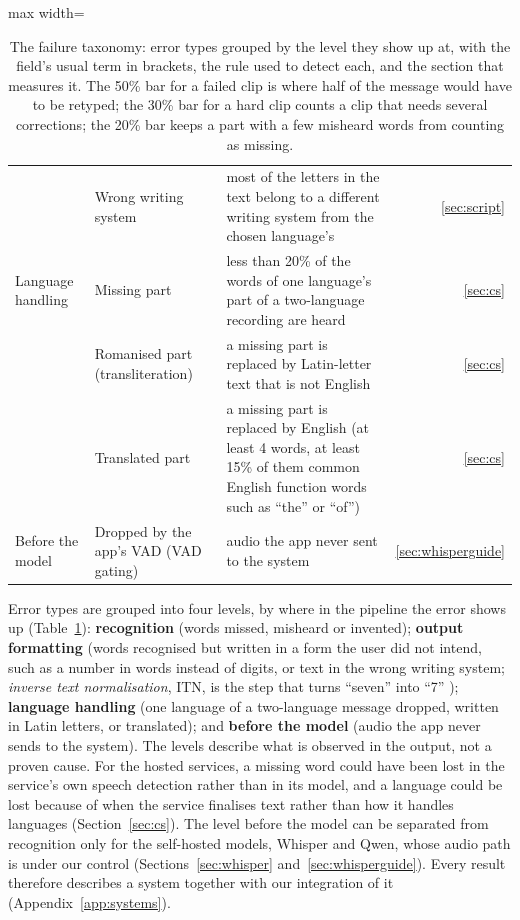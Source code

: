 \documentclass[11pt]{article}
\begin{document}
\begin{table}[!htbp]
\begin{adjustbox}{max width=\textwidth}
\begin{tabular}{@{}>{\raggedright\arraybackslash}p{2.4cm}>{\raggedright\arraybackslash}p{3.6cm}>{\raggedright\arraybackslash}p{8.2cm}r@{}}
& Wrong writing system & most of the letters in the text belong to a different writing system from the chosen language's & \ref{sec:script} \\
\addlinespace
Language handling & Missing part & less than 20\% of the words of one language's part of a two-language recording are heard & \ref{sec:cs} \\
& Romanised part (transliteration) & a missing part is replaced by Latin-letter text that is not English & \ref{sec:cs} \\
& Translated part & a missing part is replaced by English (at least 4 words, at least 15\% of them common English function words such as ``the'' or ``of'') & \ref{sec:cs} \\
\addlinespace
Before the model & Dropped by the app's VAD (VAD gating) & audio the app never sent to the system & \ref{sec:whisperguide} \\
\bottomrule
\end{tabular}
\end{adjustbox}
\caption{The failure taxonomy: error types grouped by the level they show up at, with the field's usual term in brackets, the rule used to detect each, and the section that measures it. The 50\% bar for a failed clip is where half of the message would have to be retyped; the 30\% bar for a hard clip counts a clip that needs several corrections; the 20\% bar keeps a part with a few misheard words from counting as missing.}
\label{tab:taxonomy}
\end{table}
Error types are grouped into four levels, by where in the pipeline the error shows up (Table~\ref{tab:taxonomy}): \textbf{recognition} (words missed, misheard or invented); \textbf{output formatting} (words recognised but written in a form the user did not intend, such as a number in words instead of digits, or text in the wrong writing system; \emph{inverse text normalisation}, ITN, is the step that turns ``seven'' into ``7'' \citep{pusateri2017itn}); \textbf{language handling} (one language of a two-language message dropped, written in Latin letters, or translated); and \textbf{before the model} (audio the app never sends to the system).
The levels describe what is observed in the output, not a proven cause. For the hosted services, a missing word could have been lost in the service's own speech detection rather than in its model, and a language could be lost because of when the service finalises text rather than how it handles languages (Section~\ref{sec:cs}). The level before the model can be separated from recognition only for the self-hosted models, Whisper and Qwen, whose audio path is under our control (Sections~\ref{sec:whisper} and~\ref{sec:whisperguide}). Every result therefore describes a system together with our integration of it (Appendix~\ref{app:systems}).
\end{document}
